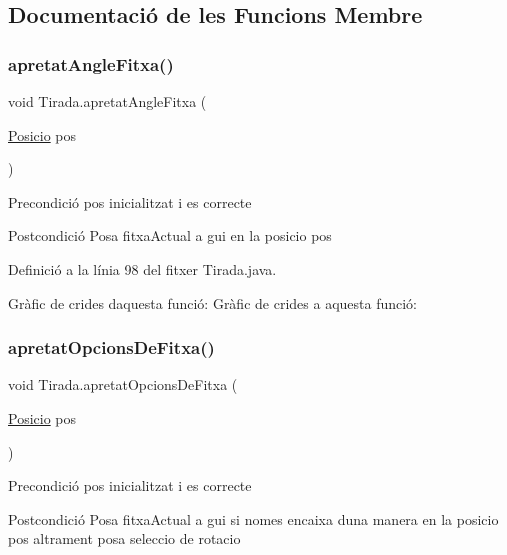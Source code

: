 \subsection{Documentació de les Funcions Membre}
\mbox{\label{class_tirada_aa56dab05d4638ad1a340f42cd514d362}} 
\subsubsection{\texorpdfstring{apretat\+Angle\+Fitxa()}{apretatAngleFitxa()}}
{\footnotesize\ttfamily void Tirada.\+apretat\+Angle\+Fitxa (\begin{DoxyParamCaption}\item[{\mbox{\hyperlink{class_posicio}{Posicio}}}]{pos }\end{DoxyParamCaption})}

\begin{DoxyPrecond}{Precondició}
pos inicialitzat i es correcte 
\end{DoxyPrecond}
\begin{DoxyPostcond}{Postcondició}
Posa fitxa\+Actual a gui en la posicio pos 
\end{DoxyPostcond}


Definició a la línia 98 del fitxer Tirada.\+java.

Gràfic de crides d\textquotesingle{}aquesta funció\+:
Gràfic de crides a aquesta funció\+:
\mbox{\label{class_tirada_adb40561c69d716539ea380f64872eb7b}} 
\subsubsection{\texorpdfstring{apretat\+Opcions\+De\+Fitxa()}{apretatOpcionsDeFitxa()}}
{\footnotesize\ttfamily void Tirada.\+apretat\+Opcions\+De\+Fitxa (\begin{DoxyParamCaption}\item[{\mbox{\hyperlink{class_posicio}{Posicio}}}]{pos }\end{DoxyParamCaption})}

\begin{DoxyPrecond}{Precondició}
pos inicialitzat i es correcte 
\end{DoxyPrecond}
\begin{DoxyPostcond}{Postcondició}
Posa fitxa\+Actual a gui si nomes encaixa d\textquotesingle{}una manera en la posicio pos altrament posa seleccio de rotacio 
\end{DoxyPostcond}


